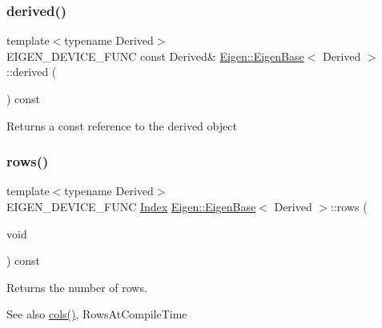 \subsubsection{\texorpdfstring{derived()}{derived()}\hspace{0.1cm}{\footnotesize\ttfamily [2/2]}}
{\footnotesize\ttfamily template$<$typename Derived$>$ \\
E\+I\+G\+E\+N\+\_\+\+D\+E\+V\+I\+C\+E\+\_\+\+F\+U\+NC const Derived\& \mbox{\hyperlink{struct_eigen_1_1_eigen_base}{Eigen\+::\+Eigen\+Base}}$<$ Derived $>$\+::derived (\begin{DoxyParamCaption}{ }\end{DoxyParamCaption}) const\hspace{0.3cm}{\ttfamily [inline]}}

\begin{DoxyReturn}{Returns}
a const reference to the derived object 
\end{DoxyReturn}
\mbox{\label{struct_eigen_1_1_eigen_base_a8141320ba8df384426c298b32b000d8e}} 
\subsubsection{\texorpdfstring{rows()}{rows()}}
{\footnotesize\ttfamily template$<$typename Derived$>$ \\
E\+I\+G\+E\+N\+\_\+\+D\+E\+V\+I\+C\+E\+\_\+\+F\+U\+NC \mbox{\hyperlink{struct_eigen_1_1_eigen_base_a554f30542cc2316add4b1ea0a492ff02}{Index}} \mbox{\hyperlink{struct_eigen_1_1_eigen_base}{Eigen\+::\+Eigen\+Base}}$<$ Derived $>$\+::rows (\begin{DoxyParamCaption}\item[{void}]{ }\end{DoxyParamCaption}) const\hspace{0.3cm}{\ttfamily [inline]}}

\begin{DoxyReturn}{Returns}
the number of rows. 
\end{DoxyReturn}
\begin{DoxySeeAlso}{See also}
\mbox{\hyperlink{struct_eigen_1_1_eigen_base_a7b0b45c7351847696c911ce8aa2abbdb}{cols()}}, Rows\+At\+Compile\+Time 
\end{DoxySeeAlso}
\mbox{\label{struct_eigen_1_1_eigen_base_ac2c9348df3bb9c0044dbae6c278a8977}} 
